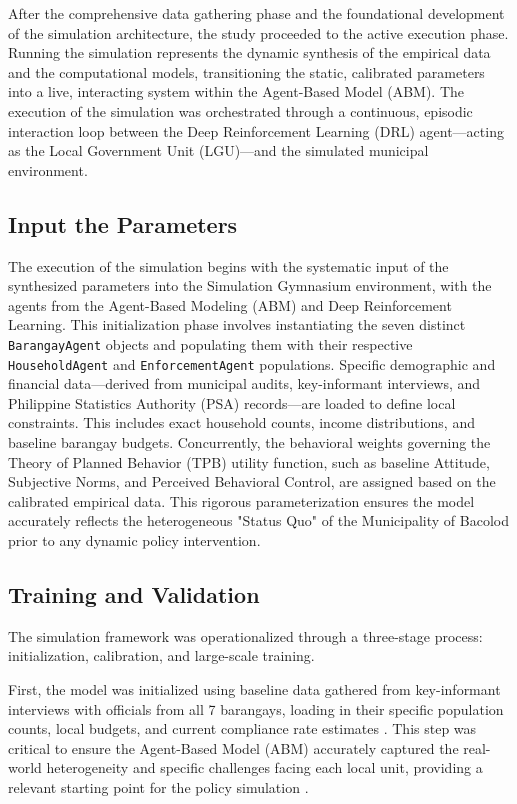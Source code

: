 After the comprehensive data gathering phase and the foundational development of the simulation architecture, the study proceeded to the active execution phase. Running the simulation represents the dynamic synthesis of the empirical data and the computational models, transitioning the static, calibrated parameters into a live, interacting system within the Agent-Based Model (ABM). The execution of the simulation was orchestrated through a continuous, episodic interaction loop between the Deep Reinforcement Learning (DRL) agent—acting as the Local Government Unit (LGU)—and the simulated municipal environment.

\subsection{Input the Parameters}
The execution of the simulation begins with the systematic input of the synthesized parameters into the Simulation Gymnasium environment, with the agents from the Agent-Based Modeling (ABM) and Deep Reinforcement Learning. This initialization phase involves instantiating the seven distinct \texttt{BarangayAgent} objects and populating them with their respective \texttt{HouseholdAgent} and \texttt{EnforcementAgent} populations. Specific demographic and financial data—derived from municipal audits, key-informant interviews, and Philippine Statistics Authority (PSA) records—are loaded to define local constraints. This includes exact household counts, income distributions, and baseline barangay budgets. Concurrently, the behavioral weights governing the Theory of Planned Behavior (TPB) utility function, such as baseline Attitude, Subjective Norms, and Perceived Behavioral Control, are assigned based on the calibrated empirical data. This rigorous parameterization ensures the model accurately reflects the heterogeneous "Status Quo" of the Municipality of Bacolod prior to any dynamic policy intervention.

\subsection{Training and Validation}
The simulation framework was operationalized through a three-stage process: initialization, calibration, and large-scale training. 

First, the model was initialized using baseline data gathered from key-informant interviews with officials from all 7 barangays, loading in their specific population counts, local budgets, and current compliance rate estimates \citep{Villanueva2021, Yazawa2025}. This step was critical to ensure the Agent-Based Model (ABM) accurately captured the real-world heterogeneity and specific challenges facing each local unit, providing a relevant starting point for the policy simulation \citep{Camarillo2021}.

